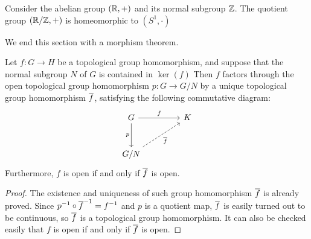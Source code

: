 \begin{exmp}
    Consider the abelian group $({\mathbb{R}}, +)$ and its normal subgroup ${\mathbb{Z}}$.
    The quotient group $({\mathbb{R}}/{\mathbb{Z}}, +)$ is homeomorphic to $(S^1, \cdot)$
\end{exmp}

We end this section with a morphism theorem.
\begin{thm}
    Let $f: G\rightarrow H$ be a topological group homomorphism, and suppose that the normal subgroup $N$ of $G$ is contained in $\ker(f)$
    Then $f$ factors through the open topological group homomorphism $p: G\rightarrow G/N$ by a unique topological group homomorphism $\overline{f}$, satisfying the following commutative diagram:
    \begin{equation*}
    \begin{tikzcd}[row sep=1.0cm, column sep=1.5cm]
        G
        \arrow[r, "f"]
        \arrow[d, "p"']
        &
        K\\
        G/N
        \arrow[ur, "\ol f"', dashed]
    \end{tikzcd}
    \end{equation*}
    Furthermore, $f$ is open if and only if $\overline{f}$ is open.
\end{thm}
\begin{proof}
    The existence and uniqueness of such group homomorphism $\overline{f}$ is already proved.
    Since $p^{-1}\circ\overline{f}^{-1}=f^{-1}$ and $p$ is a quotient map, $\overline{f}$ is easily turned out to be continuous, so $\overline{f}$ is a topological group homomorphism.
    It can also be checked easily that $f$ is open if and only if $\overline{f}$ is open.
\end{proof}